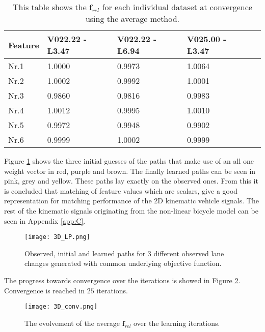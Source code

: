 \begin{table}[h!]
	\centering
	\begin{tabular}{@{}llllr@{}} \toprule
		\textbf{Feature}    & V022.22 - L3.47 & V022.22 - L6.94 & V025.00 - L3.47\\ \midrule
		Nr.1       		  &1.0000        & 0.9973 	    & 1.0064 		\\
		Nr.2              & 1.0002       & 0.9992       & 1.0001       \\
		Nr.3              & 0.9860       & 0.9816       & 0.9983       \\
		Nr.4              & 1.0012       & 0.9995       & 1.0010       \\
		Nr.5              & 0.9972       & 0.9948       & 0.9902       \\
		Nr.6              & 0.9999       & 1.0002       & 0.9999       \\ \bottomrule
	\end{tabular}
	\caption{This table shows the $\bm{f}_{rel}$ for each individual dataset at convergence using the average method.}
	\label{tab:in_av}
\end{table} 
Figure \ref{fig:3D_learned_path} shows the three initial guesses of the paths that make use of an all one weight vector in red, purple and brown. The finally learned paths can be seen in pink, grey and yellow. These paths lay exactly on the observed ones. From this it is concluded that matching of feature values which are scalars, give a good representation for matching performance of the 2D kinematic vehicle signals. The rest of the kinematic signals originating from the non-linear bicycle model can be seen in Appendix \ref{app:C}. 

 \begin{figure}[h!]
	\centering
	\texttt{[image: 3D\_LP.png]}
	\caption{Observed, initial and learned paths for 3 different observed lane changes generated with common underlying objective function.}
	\label{fig:3D_learned_path}
\end{figure}
 
The progress towards convergence over the iterations is showed in Figure \ref{fig:3D_conv}. Convergence is reached in $25$ iterations.

\begin{figure}[h!]
	\centering
	\texttt{[image: 3D\_conv.png]}
	\caption{The evolvement of the average $\bm{f}_{rel}$ over the learning iterations.}
	\label{fig:3D_conv}
\end{figure}

